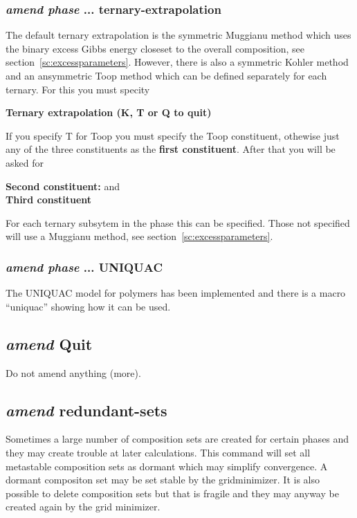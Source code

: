 \documentclass[11pt]{article}
\begin{document}
\subsubsection{{\em amend phase} ... ternary-extrapolation}\label{sc:kohler-toop2}

The default ternary extrapolation is the symmetric Muggianu method
which uses the binary excess Gibbs energy closeset to the overall
composition, see section~\ref{sc:excessparameters}.  However, there is
also a symmetric Kohler method and an ansymmetric Toop method which
can be defined separately for each ternary.  For this you must specity

{\bf Ternary extrapolation (K, T or Q to quit)}

If you specify T for Toop you must specify the Toop constituent,
othewise just any of the three constituents as the {\bf first
  constituent}.  After that you will be asked for

{\bf Second constituent:} and\\
{\bf Third constituent}

For each ternary subsytem in the phase this can be specified.  Those
not specified will use a Muggianu method, see
section~\ref{sc:excessparameters}.

\hypertarget{Amend phase UNIQUAC}{}
\subsubsection{{\em amend phase} ... UNIQUAC}

The UNIQUAC model for polymers has been implemented and there is a
macro ``uniquac'' showing how it can be used.

\hypertarget{Amend quit}{}
\subsection{{\em amend} Quit}

Do not amend anything (more).

\hypertarget{Amend redundant-sets}{}
\subsection{{\em amend} redundant-sets}

Sometimes a large number of composition sets are created for certain
phases and they may create trouble at later calculations.  This
command will set all metastable composition sets as dormant which may
simplify convergence.  A dormant compositon set may be set stable by
the gridminimizer.  It is also possible to delete composition sets but
that is fragile and they may anyway be created again by the grid
minimizer.
\end{document}
